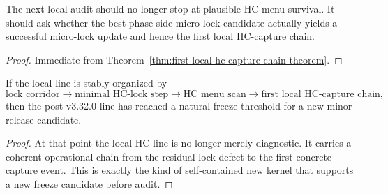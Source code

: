 \begin{corollary}
\label{cor:current-hc-capture-working-rule}
The next local audit should no longer stop at plausible HC menu survival. It should ask whether the best phase-side micro-lock candidate actually yields a successful micro-lock update and hence the first local HC-capture chain.
\end{corollary}

\begin{proof}
Immediate from Theorem~\ref{thm:first-local-hc-capture-chain-theorem}.
\end{proof}

\begin{corollary}
\label{cor:freeze-threshold-after-v3320}
If the local line is stably organized by
\[
  \text{lock corridor}
  \to
  \text{minimal HC-lock step}
  \to
  \text{HC menu scan}
  \to
  \text{first local HC-capture chain},
\]
then the post-v3.32.0 line has reached a natural freeze threshold for a new minor release candidate.
\end{corollary}

\begin{proof}
At that point the local HC line is no longer merely diagnostic. It carries a coherent operational chain from the residual lock defect to the first concrete capture event. This is exactly the kind of self-contained new kernel that supports a new freeze candidate before audit.
\end{proof}



